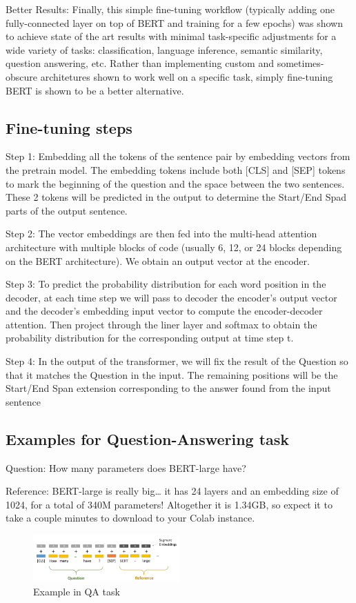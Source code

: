 \documentclass[11pt]{article}
\begin{document}
Better Results: Finally, this simple fine-tuning workflow (typically adding one fully-connected layer on top of BERT and training for a few epochs) was shown to achieve state of the art results with minimal task-specific adjustments for a wide variety of tasks: classification, language inference, semantic similarity, question answering, etc. Rather than implementing custom and sometimes-obscure architetures shown to work well on a specific task, simply fine-tuning BERT is shown to be a better alternative.\cite{mccormick2019bert}

\subsection{Fine-tuning steps}

\quad Step 1: Embedding all the tokens of the sentence pair by embedding vectors from the pretrain model. The embedding tokens include both [CLS] and [SEP] tokens to mark the beginning of the question and the space between the two sentences. These 2 tokens will be predicted in the output to determine the Start/End Spad parts of the output sentence.

Step 2: The vector embeddings are then fed into the multi-head attention architecture with multiple blocks of code (usually 6, 12, or 24 blocks depending on the BERT architecture). We obtain an output vector at the encoder.

Step 3: To predict the probability distribution for each word position in the decoder, at each time step we will pass to decoder the encoder's output vector and the decoder's embedding input vector to compute the encoder-decoder attention. Then project through the liner layer and softmax to obtain the probability distribution for the corresponding output at time step t.

Step 4: In the output of the transformer, we will fix the result of the Question so that it matches the Question in the input. The remaining positions will be the Start/End Span extension corresponding to the answer found from the input sentence
\cite{BERTmodel}
\subsection{Examples for Question-Answering task}

\quad Question: How many parameters does BERT-large have?

Reference: BERT-large is really big… it has 24 layers and an embedding size of 1024, for a total of 340M parameters! Altogether it is 1.34GB, so expect it to take a couple minutes to download to your Colab instance.
\begin{figure}[h]
	\centering
	\includegraphics[width=0.5\textwidth]{fig1.png}
	\caption{Example in QA task}
	\label{fig1}
\end{figure}
\end{document}

